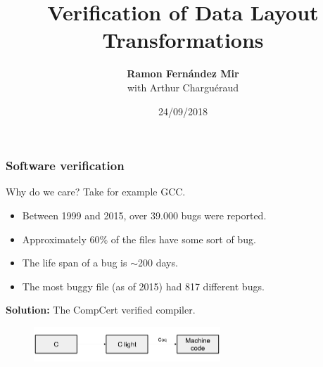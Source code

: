 \def\macrosUseBeamer{}



\usepackage{fancyvrb}
\usepackage{graphicx}
\usepackage{multicol}

\newcommand\tab{$\hphantom{--}$}

\usepackage{ebproof}
\usepackage{tikz-cd}





\title{Verification of Data Layout Transformations}
\author[Ramon Fern\'{a}ndez Mir]{{\bf Ramon Fern\'{a}ndez Mir}\\ \vspace{1em} with Arthur Charguéraud }
\date{24/09/2018}

\frame{\titlepage}





\begin{frame}[fragile]
\frametitle{Software verification}

Why do we care? Take for example GCC.
\begin{itemize}
	\item Between 1999 and 2015, over 39.000 bugs were reported.
	\item Approximately 60\% of the files have some sort of bug.
	\item The life span of a bug is $\sim$200 days.
	\item The most buggy file (as of 2015) had 817 different bugs. 
\end{itemize}

\bigskip \pause

\textbf{Solution:} The CompCert verified compiler.
\begin{figure}[H]
\centering
\includegraphics[width=7cm]{images/compcert}
\end{figure}

\end{frame}


